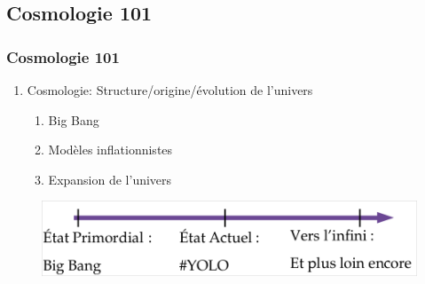 \documentclass[handout]{beamer}
\begin{document}
\subsection{Cosmologie 101}
\begin{frame}
\frametitle{Cosmologie 101}
\begin{enumerate}
\item Cosmologie: Structure/origine/évolution de l'univers
\begin{enumerate}
\item Big Bang
\item Modèles inflationnistes
\item Expansion de l'univers
\end{enumerate}
\end{enumerate}
 \begin{figure}
  \includegraphics[scale=0.3]{yolo.png}
 \end{figure}
\end{frame}


\end{document}
